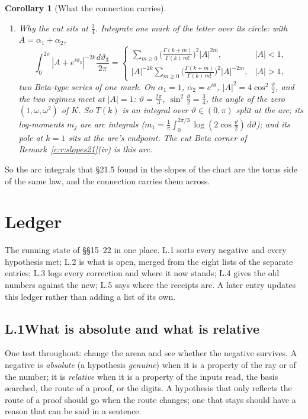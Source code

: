 \documentclass[11pt]{article}
\theoremstyle{plain}
\newtheorem{corollary}[proposition]{Corollary}
\theoremstyle{definition}
\theoremstyle{remark}
\renewcommand{\thesection}{15}
\begin{document}
\begin{corollary}[What the connection carries]
\begin{enumerate}[label=(\roman*)]
\item \emph{Why the cut sits at $\frac34$.} Integrate one mark of the letter over its circle: with $A=\alpha_1+\alpha_2$,
\[
\int_0^{2\pi}|A+e^{i\vartheta_3}|^{-2k}\frac{d\vartheta_3}{2\pi}=\begin{cases}\sum_{m\ge0}\big(\frac{\Gamma(k+m)}{\Gamma(k)\,m!}\big)^2|A|^{2m},&|A|<1,\\[3pt] |A|^{-2k}\sum_{m\ge0}\big(\frac{\Gamma(k+m)}{\Gamma(k)\,m!}\big)^2|A|^{-2m},&|A|>1,\end{cases}
\]
two Beta-type series of one mark. On $\alpha_1=1$, $\alpha_2=e^{i\vartheta}$, $|A|^2=4\cos^2\frac\vartheta2$, and the two regimes meet at $|A|=1$: $\vartheta=\frac{2\pi}3$, $\sin^2\frac\vartheta2=\frac34$, the angle of the zero $(1,\omega,\omega^2)$ of $K$. So $T(k)$ is an integral over $\vartheta\in(0,\pi)$ split at the arc; its log-moments $m_j$ are arc integrals ($m_1=\frac1\pi\int_0^{2\pi/3}\log(2\cos\frac\vartheta2)\,d\vartheta$); and its pole at $k=1$ sits at the arc's endpoint. The cut Beta corner of Remark~\ref{c:r:slopes21}(iv) is this arc.
\end{enumerate}
\end{corollary}

\noindent So the arc integrals that \S21.5 found in the slopes of the chart are the torus side of the same law, and the connection carries them across.

\clearpage
\renewcommand{\thesection}{L}

\section{Ledger}

The running state of \S\S15--22 in one place. L.1 sorts every negative and every hypothesis met; L.2 is what is open, merged from the eight lists of the separate entries; L.3 logs every correction and where it now stands; L.4 gives the old numbers against the new; L.5 says where the receipts are. A later entry updates this ledger rather than adding a list of its own.

\subsection*{L.1\quad What is absolute and what is relative}

One test throughout: change the arena and see whether the negative survives. A negative is \emph{absolute} (a hypothesis \emph{genuine}) when it is a property of the ray or of the number; it is \emph{relative} when it is a property of the inputs read, the basis searched, the route of a proof, or the digits. A hypothesis that only reflects the route of a proof should go when the route changes; one that stays should have a reason that can be said in a sentence.
\end{document}
